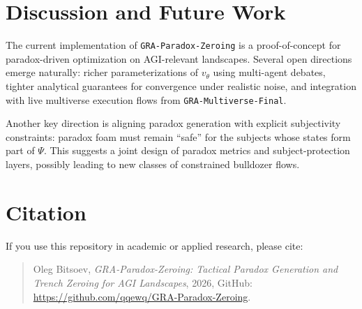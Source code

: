 \documentclass[11pt]{article}
\begin{document}
\section{Discussion and Future Work}

The current implementation of \texttt{GRA-Paradox-Zeroing} is a proof-of-concept for paradox-driven optimization on AGI-relevant landscapes. 
Several open directions emerge naturally: richer parameterizations of $v_{\theta}$ using multi-agent debates, tighter analytical guarantees for convergence under realistic noise, and integration with live multiverse execution flows from \texttt{GRA-Multiverse-Final}.

Another key direction is aligning paradox generation with explicit subjectivity constraints: paradox foam must remain ``safe'' for the subjects whose states form part of $\Psi$. 
This suggests a joint design of paradox metrics and subject-protection layers, possibly leading to new classes of constrained bulldozer flows.

\section*{Citation}

If you use this repository in academic or applied research, please cite:
\begin{quote}
Oleg Bitsoev, \emph{GRA-Paradox-Zeroing: Tactical Paradox Generation and Trench Zeroing for AGI Landscapes}, 2026, GitHub: \url{https://github.com/qqewq/GRA-Paradox-Zeroing}.
\end{quote}
\end{document}
